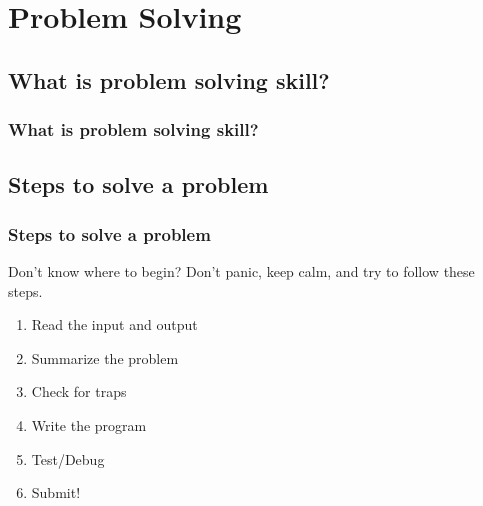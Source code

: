 \documentclass{beamer}
\begin{document}

\section{Problem Solving}
\subsection{What is problem solving skill?}

\begin{frame}
  \frametitle{What is problem solving skill?}



\end{frame}

\subsection{Steps to solve a problem}
\begin{frame}
  \frametitle{Steps to solve a problem} 

  Don't know where to begin?  Don't panic, keep calm, and try to
  follow these steps.

  \begin{enumerate}
  \item Read the input and output
  \item Summarize the problem
  \item Check for traps
  \item Write the program
  \item Test/Debug
  \item Submit!
  \end{enumerate}
\end{frame}


\end{document}
